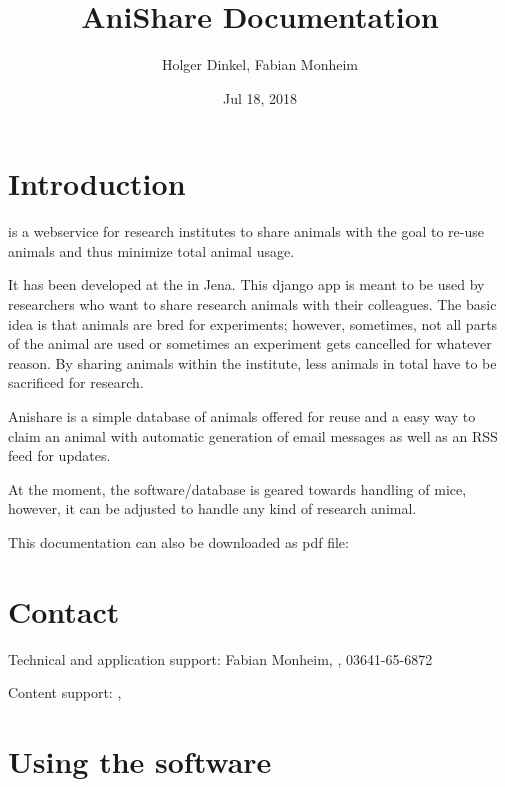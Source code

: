 \documentclass[letterpaper,10pt,openany,oneside,english]{sphinxmanual}
\title{AniShare Documentation}
\date{Jul 18, 2018}
\author{Holger Dinkel, Fabian Monheim}
\begin{document}
\maketitle
\sphinxtableofcontents
{}\label{\detokenize{index::doc}}



\chapter{Introduction}
\label{\detokenize{index:introduction}}
 is a webservice for research institutes to share animals with the goal to re-use
animals and thus minimize total animal usage.

It has been developed at the  in
Jena. This django app is meant to be used by researchers who want to share research animals with
their colleagues. The basic idea is that animals are bred for experiments; however, sometimes, not
all parts of the animal are used or sometimes an experiment gets cancelled for whatever reason. By
sharing animals within the institute, less animals in total have to be sacrificed for research.

Anishare is a simple database of animals offered for reuse and a easy way to claim an animal with
automatic generation of email messages as well as an RSS feed for updates.

\noindent{}

At the moment, the software/database is geared towards handling of mice, however, it can be adjusted
to handle any kind of research animal.

This documentation can also be downloaded as pdf file: 


\chapter{Contact}
\label{\detokenize{index:contact}}
Technical and application support: Fabian Monheim, , 03641-65-6872

Content support: , 


\chapter{Using the software}
\label{\detokenize{index:using-the-software}}
\noindent{}
\end{document}
